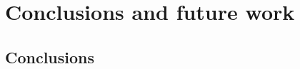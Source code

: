 \chapter{Conclusions and future work}
\label{ch:ConclusionsAndFutureWork}

\section{Conclusions}
\label{sec:Conclusions}


